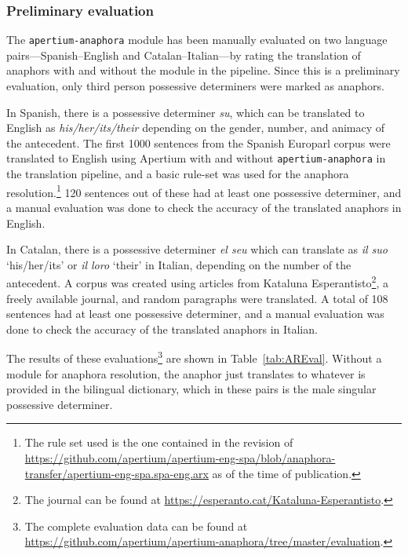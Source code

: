 \documentclass[free]{flammie}
\begin{document}
\subsubsection{Preliminary evaluation}\label{sec:AREvaluation}

The \texttt{apertium-anaphora} module has been manually evaluated on two
language pairs---Spanish--English and Catalan--Italian---by rating the
translation of anaphors with and without the module in the pipeline. Since this
is a preliminary evaluation, only third person possessive determiners were
marked as anaphors.

In Spanish, there is a possessive determiner \textit{su}, which can be
translated to English as \textit{his/her/its/their} depending on the gender,
number, and animacy of the antecedent. The first 1000 sentences from the Spanish
Europarl corpus were translated to English using Apertium with and without
\texttt{apertium-anaphora} in the translation pipeline, and a basic rule-set was
used for the anaphora resolution.\footnote{The rule set used is the one
contained in the revision of
\url{https://github.com/apertium/apertium-eng-spa/blob/anaphora-transfer/apertium-eng-spa.spa-eng.arx}
as of the time of publication.}  120 sentences out of these had at least one
possessive determiner, and a manual evaluation was done to check the accuracy of
the translated anaphors in English.

In Catalan, there is a possessive determiner \textit{el seu} which can translate
as \textit{il suo} `his/her/its' or \textit{il loro} `their' in Italian,
depending on the number of the antecedent. A corpus was created using articles
from Kataluna Esperantisto\footnote{The journal can be found at
\url{https://esperanto.cat/Kataluna-Esperantisto}.}, a freely available journal,
and random paragraphs were translated.  A total of 108 sentences had at least
one possessive determiner, and a manual evaluation was done to check the
accuracy of the translated anaphors in Italian.

The results of these evaluations\footnote{The complete evaluation data can be
found at
\url{https://github.com/apertium/apertium-anaphora/tree/master/evaluation}.} are
shown in Table~\ref{tab:AREval}. Without a module for anaphora resolution, the
anaphor just translates to whatever is provided in the bilingual dictionary,
which in these pairs is the male singular possessive determiner.
\end{document}
